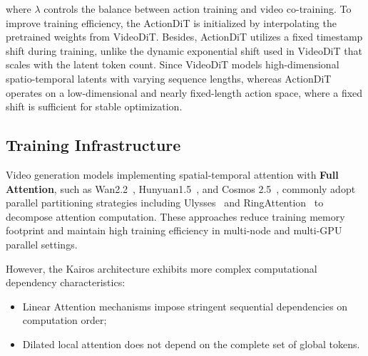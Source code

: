 \documentclass{llmxive}
\begin{document}
where $\lambda$ controls the balance between action training and video co-training. To improve training efficiency, the ActionDiT is initialized by interpolating the pretrained weights from VideoDiT. Besides, ActionDiT utilizes a fixed timestamp shift during training, unlike the dynamic exponential shift used in VideoDiT that scales with the latent token count. Since VideoDiT models high-dimensional spatio-temporal latents with varying sequence lengths, whereas ActionDiT operates on a low-dimensional and nearly fixed-length action space, where a fixed shift is sufficient for stable optimization.








\subsection{Training Infrastructure}

Video generation models implementing spatial-temporal attention with \textbf{Full Attention}, such as Wan2.2~\cite{wan2025}, Hunyuan1.5~\cite{hyworld2025}, and Cosmos 2.5~\cite{nvidia2025worldsimulationvideofoundation}, commonly adopt parallel partitioning strategies including Ulysses~\cite{jacobs2023deepspeedulyssesoptimizationsenabling} and RingAttention~\cite{liu2023ringattentionblockwisetransformers} to decompose attention computation. These approaches reduce training memory footprint and maintain high training efficiency in multi-node and multi-GPU parallel settings.

However, the Kairos architecture exhibits more complex computational dependency characteristics:
\begin{itemize}
    \item Linear Attention mechanisms impose stringent sequential dependencies on computation order;
    \item Dilated local attention does not depend on the complete set of global tokens.
\end{itemize}
\end{document}
